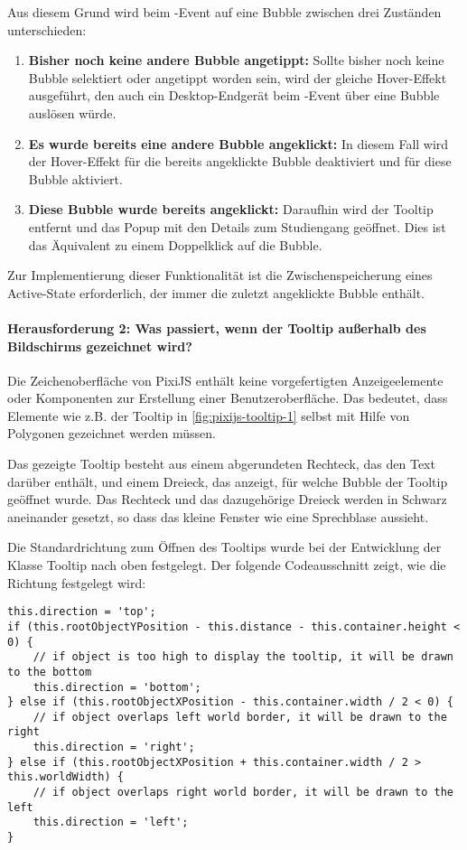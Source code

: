 Aus diesem Grund wird beim -Event auf eine Bubble zwischen drei Zuständen unterschieden:

\begin{enumerate}
    \item \textbf{Bisher noch keine andere Bubble angetippt:} Sollte bisher noch keine Bubble selektiert oder angetippt worden sein, wird der gleiche Hover-Effekt ausgeführt, den auch ein Desktop-Endgerät beim -Event über eine Bubble auslösen würde.
    \item \textbf{Es wurde bereits eine andere Bubble angeklickt:} In diesem Fall wird der Hover-Effekt für die bereits angeklickte Bubble deaktiviert und für diese Bubble aktiviert.
    \item \textbf{Diese Bubble wurde bereits angeklickt:} Daraufhin wird der Tooltip entfernt und das Popup mit den Details zum Studiengang geöffnet. Dies ist das Äquivalent zu einem Doppelklick auf die Bubble.
\end{enumerate}

Zur Implementierung dieser Funktionalität ist die Zwischenspeicherung eines Active-State erforderlich, der immer die zuletzt angeklickte Bubble enthält.

\paragraph*{Herausforderung 2: Was passiert, wenn der Tooltip außerhalb des Bildschirms gezeichnet wird?}
Die Zeichenoberfläche von PixiJS enthält keine vorgefertigten Anzeigeelemente oder Komponenten zur Erstellung einer Benutzeroberfläche. Das bedeutet, dass Elemente wie z.B. der Tooltip in \autoref{fig:pixijs-tooltip-1} selbst mit Hilfe von Polygonen gezeichnet werden müssen.

Das gezeigte Tooltip besteht aus einem abgerundeten Rechteck, das den Text darüber enthält, und einem Dreieck, das anzeigt, für welche Bubble der Tooltip geöffnet wurde. Das Rechteck und das dazugehörige Dreieck werden in Schwarz aneinander gesetzt, so dass das kleine Fenster wie eine Sprechblase aussieht.

Die Standardrichtung zum Öffnen des Tooltips wurde bei der Entwicklung der Klasse Tooltip nach oben festgelegt. Der folgende Codeausschnitt zeigt, wie die Richtung festgelegt wird:

\begin{lstlisting}[style=Python]
this.direction = 'top';
if (this.rootObjectYPosition - this.distance - this.container.height < 0) {
    // if object is too high to display the tooltip, it will be drawn to the bottom
    this.direction = 'bottom';
} else if (this.rootObjectXPosition - this.container.width / 2 < 0) {
    // if object overlaps left world border, it will be drawn to the right        
    this.direction = 'right';
} else if (this.rootObjectXPosition + this.container.width / 2 > this.worldWidth) {
    // if object overlaps right world border, it will be drawn to the left
    this.direction = 'left';
}
\end{lstlisting}

